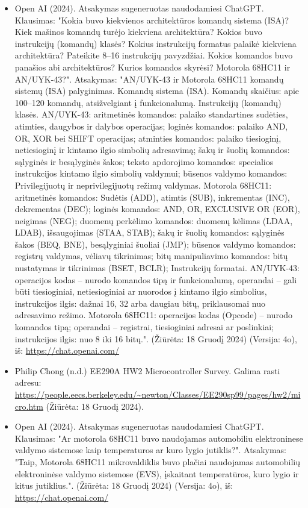 \documentclass[a4paper,12pt]{article}
\begin{document}
\begin{itemize}
    \item Open AI (2024). Atsakymas sugeneruotas naudodamiesi ChatGPT. Klausimas: "Kokia buvo kiekvienos architektūros komandų sistema (ISA)? Kiek mašinos komandų turėjo kiekviena architektūra? Kokios buvo instrukcijų (komandų) klasės? Kokius instrukcijų formatus palaikė kiekviena architektūra? Pateikite 8–16 instrukcijų pavyzdžiai. Kokios komandos buvo panašios abi architektūros? Kurios komandos skyrėsi? Motorola 68HC11 ir AN/UYK-43?". Atsakymas: "AN/UYK-43 ir Motorola 68HC11 komandų sistemų (ISA) palyginimas. Komandų sistema (ISA). Komandų skaičius: apie 100–120 komandų, atsižvelgiant į funkcionalumą. Instrukcijų (komandų) klasės. AN/UYK-43: aritmetinės komandos: palaiko standartines sudėties, atimties, daugybos ir dalybos operacijas; loginės komandos: palaiko AND, OR, XOR bei SHIFT operacijas; atminties komandos: palaiko tiesioginį, netiesioginį ir kintamo ilgio simbolių adresavimą; šakų ir šuolių komandos: sąlyginės ir besąlyginės šakos; teksto apdorojimo komandos: specialios instrukcijos kintamo ilgio simbolių valdymui; būsenos valdymo komandos: Privilegijuotų ir neprivilegijuotų režimų valdymas. Motorola 68HC11: aritmetinės komandos: Sudėtis (ADD), atimtis (SUB), inkrementas (INC), dekrementas (DEC); loginės komandos: AND, OR, EXCLUSIVE OR (EOR), neigimas (NEG); duomenų perkėlimo komandos: duomenų kėlimas (LDAA, LDAB), išsaugojimas (STAA, STAB); šakų ir šuolių komandos: sąlyginės šakos (BEQ, BNE), besąlyginiai šuoliai (JMP); būsenos valdymo komandos: registrų valdymas, vėliavų tikrinimas; bitų manipuliavimo komandos: bitų nustatymas ir tikrinimas (BSET, BCLR); Instrukcijų formatai. AN/UYK-43: operacijos kodas – nurodo komandos tipą ir funkcionalumą, operandai – gali būti tiesioginiai, netiesioginiai ar nuorodos į kintamo ilgio simbolius, instrukcijos ilgis: dažnai 16, 32 arba daugiau bitų, priklausomai nuo adresavimo režimo. Motorola 68HC11: operacijos kodas (Opcode) – nurodo komandos tipą; operandai – registrai, tiesioginiai adresai ar poslinkiai; instrukcijos ilgis: nuo 8 iki 16 bitų.". (Žiūrėta: 18 Gruodį 2024) (Versija: 4o), iš: \url{https://chat.openai.com/}
    \item Philip Chong (n.d.) EE290A HW2 Microcontroller Survey. Galima rasti adresu: \url{https://people.eecs.berkeley.edu/~newton/Classes/EE290sp99/pages/hw2/micro.htm} (Žiūrėta: 18 Gruodį 2024).
    \item Open AI (2024). Atsakymas sugeneruotas naudodamiesi ChatGPT. Klausimas: "Ar motorola 68HC11 buvo naudojamas automobiliu elektroninese valdymo sistemose kaip temperaturos ar kuro lygio jutiklis?". Atsakymas: "Taip, Motorola 68HC11 mikrovaldiklis buvo plačiai naudojamas automobilių elektroninėse valdymo sistemose (EVS), įskaitant temperatūros, kuro lygio ir kitus jutiklius.". (Žiūrėta: 18 Gruodį 2024) (Versija: 4o), iš: \url{https://chat.openai.com/}

\end{itemize}
\end{document}
